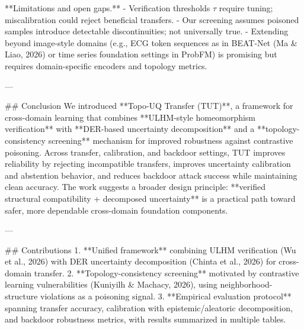 **Limitations and open gaps.**  
- Verification thresholds \(\tau\) require tuning; miscalibration could reject beneficial transfers.  
- Our screening assumes poisoned samples introduce detectable discontinuities; not universally true.  
- Extending beyond image-style domains (e.g., ECG token sequences as in BEAT-Net (Ma & Liao, 2026) or time series foundation settings in ProbFM) is promising but requires domain-specific encoders and topology metrics.

---

## Conclusion  
We introduced **Topo-UQ Transfer (TUT)**, a framework for cross-domain learning that combines **ULHM-style homeomorphism verification** with **DER-based uncertainty decomposition** and a **topology-consistency screening** mechanism for improved robustness against contrastive poisoning. Across transfer, calibration, and backdoor settings, TUT improves reliability by rejecting incompatible transfers, improves uncertainty calibration and abstention behavior, and reduces backdoor attack success while maintaining clean accuracy. The work suggests a broader design principle: **verified structural compatibility + decomposed uncertainty** is a practical path toward safer, more dependable cross-domain foundation components.

---

## Contributions  
1. **Unified framework** combining ULHM verification (Wu et al., 2026) with DER uncertainty decomposition (Chinta et al., 2026) for cross-domain transfer.  
2. **Topology-consistency screening** motivated by contrastive learning vulnerabilities (Kuniyilh & Machacy, 2026), using neighborhood-structure violations as a poisoning signal.  
3. **Empirical evaluation protocol** spanning transfer accuracy, calibration with epistemic/aleatoric decomposition, and backdoor robustness metrics, with results summarized in multiple tables.